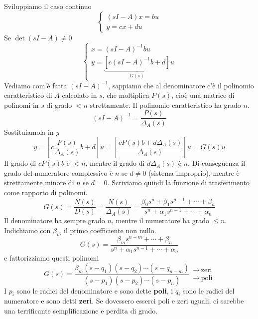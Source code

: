 \documentclass[10pt,a4paper]{book}
\begin{document}
Sviluppiamo il caso continuo
\begin{equation*}
	\begin{cases}
		(sI-A)x=bu \\
		y=cx+du    
	\end{cases}
\end{equation*}
Se $\det(sI-A) \neq 0$
\begin{equation*}
	\begin{cases}
		x=(sI-A)^{-1} bu                                       \\
		y=\underbrace{\left[ c(sI-A)^{-1} b+d\right]}_{G(s)} u 
	\end{cases}
\end{equation*}
Vediamo com'è fatta $(sI-A)^{-1}$, sappiamo che al denominatore c'è il polinomio caratteristico di $A$ calcolato in $s$, che moltiplica $P(s)$, cioè una matrice di polinomi in $s$ di grado $< n$ strettamente. Il polinomio caratteristico ha grado $n$.
\begin{equation*}
	(sI-A)^{-1} =\frac{P(s)}{\Delta _A(s)}
\end{equation*}
Sostituiamola in $y$
\begin{equation*}
	y=\left[ c\frac{P(s)}{\Delta _A(s)} b+d\right] u=\left[\frac{cP(s) b+d\Delta _A(s)}{\Delta _A(s)}\right] u=G(s) u
\end{equation*}
Il grado di $cP(s) b$ è $< n$, mentre il grado di $d\Delta _A(s)$ è $n$. Di conseguenza il grado del numeratore complessivo è $n$ se $d\neq 0$ (sistema improprio), mentre è strettamente minore di $n$ se $d=0$. Scriviamo quindi la funzione di trasferimento come rapporto di polinomi.
\begin{equation*}
	G(s) =\frac{N(s)}{D(s)} =\frac{N(s)}{\Delta _A(s)} =\frac{\beta _0 s^n +\beta _1 s^{n-1} +\cdots +\beta _n}{s^n +\alpha _1 s^{n-1} +\cdots +\alpha _n}
\end{equation*}
Il denominatore ha sempre grado $n$, mentre il numeratore ha grado $\leqslant n$. Indichiamo con $\beta _m$ il primo coefficiente non nullo.
\begin{equation*}
	G(s) =\frac{\beta _m s^{n-m} +\cdots +\beta _n}{s^n +\alpha _1 s^{n-1} +\cdots +\alpha _n}
\end{equation*}
e fattorizziamo questi polinomi
\begin{equation}
	G(s) =\frac{\beta _m(s-q_1)(s-q_2) \cdots (s-q_{n-m})}{(s-p_1)(s-p_2) \cdots (s-p_n)}\begin{array}{ l }
	\rightarrow \ \text{zeri}\\
	\rightarrow \ \text{poli}
	\end{array}
\end{equation}
I $p_i$ sono le radici del denominatore e sono dette \textbf{poli}, i $q_i$ sono le radici del numeratore e sono detti \textbf{zeri}. Se dovessero esserci poli e zeri uguali, ci sarebbe una terrificante semplificazione e perdita di grado.
\end{document}
